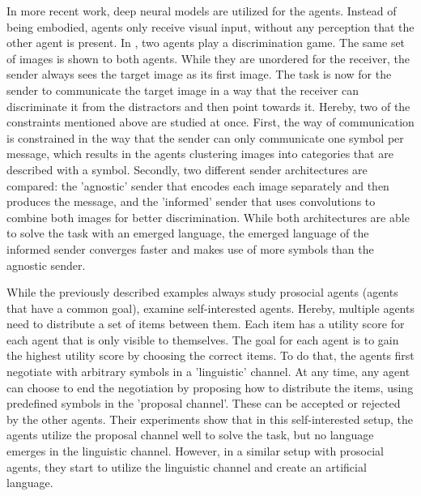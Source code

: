 In more recent work, deep neural models are utilized for the agents.
Instead of being embodied, agents only receive visual input, without any perception that the other agent is present.
In \citep{Lazaridou2017}, two agents play a discrimination game.
The same set of images is shown to both agents.
While they are unordered for the receiver, the sender always sees the target image as its first image.
The task is now for the sender to communicate the target image in a way that the receiver can discriminate it from the distractors and then point towards it.
Hereby, two of the constraints mentioned above are studied at once.
First, the way of communication is constrained in the way that the sender can only communicate one symbol per message, which results in the agents clustering images into categories that are described with a symbol.
Secondly, two different sender architectures are compared: the 'agnostic' sender that encodes each image separately and then produces the message, and the 'informed' sender that uses convolutions to combine both images for better discrimination.
While both architectures are able to solve the task with an emerged language, the emerged language of the informed sender converges faster and makes use of more symbols than the agnostic sender.

While the previously described examples always study prosocial agents (agents that have a common goal), \citet{Cao2018} examine self-interested agents.
Hereby, multiple agents need to distribute a set of items between them.
Each item has a utility score for each agent that is only visible to themselves.
The goal for each agent is to gain the highest utility score by choosing the correct items.
To do that, the agents first negotiate with arbitrary symbols in a 'linguistic' channel.
At any time, any agent can choose to end the negotiation by proposing how to distribute the items, using predefined symbols in the 'proposal channel'.
These can be accepted or rejected by the other agents.
Their experiments show that in this self-interested setup, the agents utilize the proposal channel well to solve the task, but no language emerges in the linguistic channel.
However, in a similar setup with prosocial agents, they start to utilize the linguistic channel and create an artificial language.

